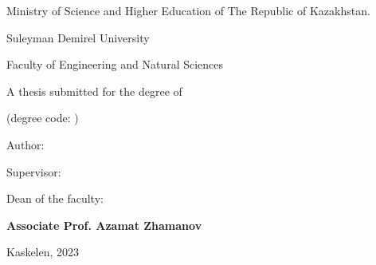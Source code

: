 \newpage
\pagestyle{empty}

\begin{center}
\large
Ministry of Science and Higher Education of The Republic of Kazakhstan. 

Suleyman Demirel University

Faculty of Engineering and Natural Sciences

\vspace{2cm}
\textbf{\mytitle}

\vspace{1cm}
\large
A thesis submitted for the degree of

\mydegree

(degree code: \mydegreecode)

\vspace{2cm}
Author: \textbf{\myauthor}

\vspace{2cm}
Supervisor: \textbf{\mycoach}

\vspace{2cm}
Dean of the faculty:

\textbf{Associate Prof. Azamat Zhamanov}


\vfill
Kaskelen, 2023
\end{center}